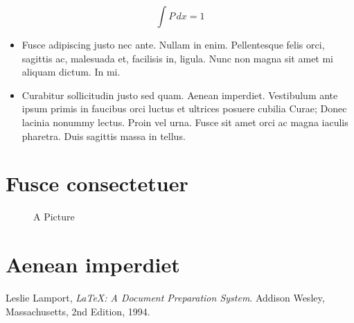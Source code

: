\documentclass{template/openetcs_article_nocc}
\begin{document}
\lipsum[11]

\begin{equation}
  \label{eq:B}
  \int P\,dx =1
\end{equation}

\begin{itemize}
\item Fusce adipiscing justo nec ante. Nullam in enim.
  Pellentesque felis orci, sagittis ac, malesuada et, facilisis in,
  ligula. Nunc non magna sit amet mi aliquam dictum. In mi.
\item Curabitur
  sollicitudin justo sed quam. Aenean imperdiet. Vestibulum ante ipsum
  primis in faucibus orci luctus et ultrices posuere cubilia Curae;
  Donec lacinia nonummy lectus. Proin vel urna. Fusce sit amet orci ac
  magna iaculis pharetra. Duis sagittis massa in tellus.
\end{itemize}

\section{Fusce consectetuer}

\lipsum[10]

\begin{figure}
  \centering
  \caption{A Picture}
  \label{fig:nola}
\end{figure}

\section{Aenean imperdiet}

\lipsum[11]

\nocite{*}






\begin{thebibliography}{9}

  Leslie Lamport,
  \emph{\LaTeX: A Document Preparation System}.
  Addison Wesley, Massachusetts,
  2nd Edition,
  1994.

\end{thebibliography}

\end{document}
